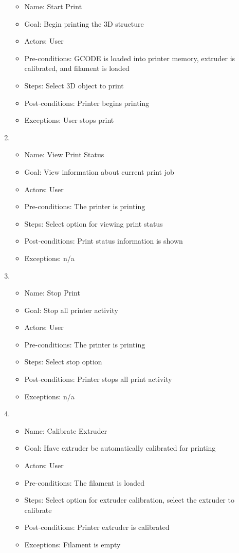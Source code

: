 \begin{enumerate}
	\begin{itemize}
	\item Name: Start Print
	\item Goal: Begin printing the 3D structure 
	\item Actors: User
	\item Pre-conditions: GCODE is loaded into printer memory, extruder is calibrated, and filament is loaded
	\item Steps: Select 3D object to print
	\item Post-conditions: Printer begins printing
	\item Exceptions: User stops print
	\end{itemize}
	\item 
	\begin{itemize}
	\item Name: View Print Status
	\item Goal: View information about current print job
	\item Actors: User
	\item Pre-conditions: The printer is printing
	\item Steps: Select option for viewing print status
	\item Post-conditions: Print status information is shown
	\item Exceptions: n/a
	\end{itemize}
	\item 
	\begin{itemize}
	\item Name: Stop Print
	\item Goal: Stop all printer activity
	\item Actors: User
	\item Pre-conditions: The printer is printing
	\item Steps: Select stop option
	\item Post-conditions: Printer stops all print activity
	\item Exceptions: n/a
	\end{itemize}
	\item 
	\begin{itemize}
	\item Name: Calibrate Extruder
	\item Goal: Have extruder be automatically calibrated for printing
	\item Actors: User
	\item Pre-conditions: The filament is loaded
	\item Steps: Select option for extruder calibration, select the extruder to calibrate
	\item Post-conditions: Printer extruder is calibrated
	\item Exceptions: Filament is empty
	\end{itemize}
\end{enumerate}
